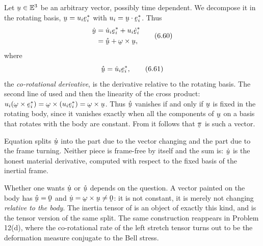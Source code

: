 Let $\bu\in\Vt$ be an arbitrary vector, possibly time dependent. We
decompose it in the rotating basis, $\bu=u_{i}\be^{*}_{i}$ with
$u_{i}=\ip\bu{\be^{*}_{i}}$. Thus
\begin{equation}
\begin{aligned}
   \dot\bu&=\dot u_{i}\be^{*}_{i}+u_{i}\dot{\be}^{*}_{i}\\
          &=\mathring{\bu}+\bom\times\bu ,
\end{aligned}
   \tag{6.60}\label{eq:6.60}
\end{equation}
where
\begin{equation}
   \mathring{\bu}=\dot u_{i}\be^{*}_{i} ,
   \tag{6.61}\label{eq:6.61}
\end{equation}
the \emph{co-rotational derivative}, is the derivative relative to the
rotating basis. The second line of  used  and then
the linearity of the cross product: $u_{i}(\bom\times\be^{*}_{i})
=\bom\times(u_{i}\be^{*}_{i})=\bom\times\bu$. Thus $\mathring{\bu}$
vanishes if and only if $\bu$ is fixed in the rotating body, since it
vanishes exactly when all the components of $\bu$ on a basis that
rotates with the body are constant. From  it follows that
$\vek\pi$ is such a vector.

\begin{remark}\label{rem:ch6corot}
Equation  splits $\dot\bu$ into the part due to the vector
changing and the part due to the frame turning. Neither piece is
frame-free by itself and the sum is: $\dot\bu$ is the honest material
derivative, computed with respect to the fixed basis of the inertial
frame.

Whether one wants $\dot\bu$ or $\mathring{\bu}$ depends on the
question. A vector painted on the body has $\mathring{\bu}=\bze$ and
$\dot\bu=\bom\times\bu\neq\bze$: it is not constant, it is merely not
changing \emph{relative to the body}. The inertia tensor of
 is an object of exactly this kind, and  is the
tensor version of the same split. The same construction reappears in
Problem 12(d), where the co-rotational rate of the left stretch tensor
turns out to be the deformation measure conjugate to the Bell stress.
\end{remark}

